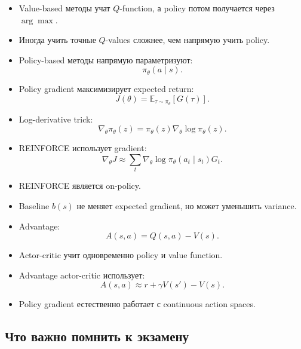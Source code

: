 \documentclass[a4paper,12pt]{article}
\begin{document}
\begin{itemize}
    \item Value-based методы учат \(Q\)-function, а policy потом получается через \(\arg\max\).
    \item Иногда учить точные \(Q\)-values сложнее, чем напрямую учить policy.
    \item Policy-based методы напрямую параметризуют:
    \[
    \pi_\theta(a\mid s).
    \]

    \item Policy gradient максимизирует expected return:
    \[
    J(\theta)=\mathbb{E}_{\tau\sim\pi_\theta}[G(\tau)].
    \]

    \item Log-derivative trick:
    \[
    \nabla_\theta \pi_\theta(z)
    =
    \pi_\theta(z)\nabla_\theta\log\pi_\theta(z).
    \]

    \item REINFORCE использует gradient:
    \[
    \nabla_\theta J
    \approx
    \sum_t
    \nabla_\theta
    \log \pi_\theta(a_t\mid s_t)G_t.
    \]

    \item REINFORCE является on-policy.
    \item Baseline \(b(s)\) не меняет expected gradient, но может уменьшить variance.
    \item Advantage:
    \[
    A(s,a)=Q(s,a)-V(s).
    \]

    \item Actor-critic учит одновременно policy и value function.
    \item Advantage actor-critic использует:
    \[
    A(s,a)\approx r+\gamma V(s')-V(s).
    \]

    \item Policy gradient естественно работает с continuous action spaces.
\end{itemize}

\subsection{Что важно помнить к экзамену}
\end{document}
